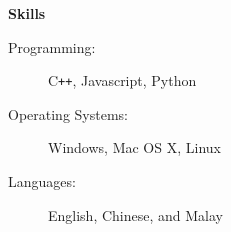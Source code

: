 \documentclass[letterpaper,11pt]{article}
\makeatletter
\newcommand{\resitem}[1]{\item #1 \vspace{-2pt}}
\newcommand{\resheading}[1]{{\begin{mdframed}[backgroundcolor=mygray]{\large \textbf{#1}}\end{mdframed}}}
\newcommand{\restitle}[2]{
\begin{tabular*}{7.1in}{l@{\extracolsep{\fill}}r}
		\textbf{#1} & #2 \\
\end{tabular*}}
\makeatother
\begin{document}



\resheading{Skills}

\begin{description}
\item[Programming:]
C\texttt{++}, Javascript, Python
\item[Operating Systems:]
Windows, Mac OS X, Linux
\item[Languages:]
English, Chinese, and Malay
\end{description}
\end{document}
